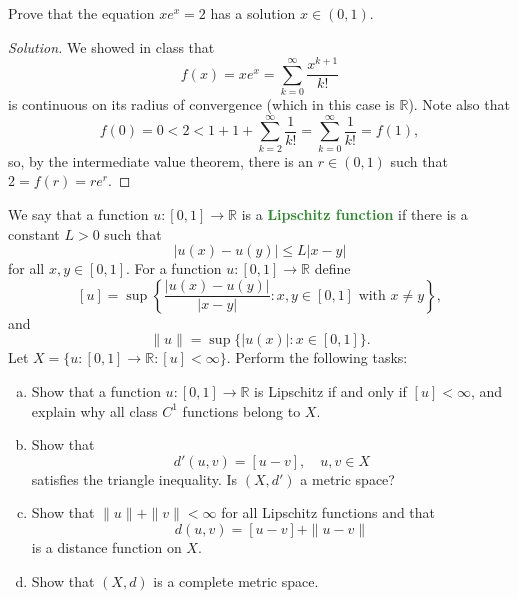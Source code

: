 \documentclass[11pt]{scrartcl}
\providecommand{\RR}{\mathbb R}
\providecommand{\ii}{\item}
\newenvironment{soln}{\begin{proof}[Solution]}{\end{proof}}
\providecommand{\vocab}[1]{{\textbf{\textcolor{ForestGreen}{#1}}}}
\begin{document}
\pagebreak
\begin{problem}
	Prove that the equation $xe^x = 2$ has a solution $x\in(0,1)$.
\end{problem}
\begin{soln}
	We showed in class that
	\[f(x) = xe^x = \sum_{k=0}^\infty \frac{x^{k+1}}{k!}\]
	is continuous on its radius of convergence (which in this case is $\RR$).
	Note also that
	\[f(0) = 0 < 2 < 1 + 1 + \sum_{k=2}^\infty \frac{1}{k!} =
	\sum_{k=0}^\infty \frac{1}{k!} = f(1),\]
	so, by the intermediate value theorem, there is an $r\in(0,1)$
	such that $2 = f(r) = re^r$.
\end{soln}

\pagebreak
\begin{problem}
	We say that a function $u\colon[0,1]\to\RR$ is a \vocab{Lipschitz function}
	if there is a constant $L > 0$ such that
	\[|u(x) - u(y)| \le L|x - y|\]
	for all $x,y\in[0,1]$. For a function $u\colon[0,1]\to\RR$ define
	\[[u] = \sup\left\{\frac{|u(x) - u(y)|}{|x - y|} :
	x, y\in[0,1]\text{ with }x\ne y\right\},\]
	and
	\[\|u\| = \sup\{|u(x)| : x\in[0,1]\}.\]
	Let $X = \{u\colon[0,1]\to\RR : [u] < \infty\}$.
	Perform the following tasks:
	\begin{enumerate}[(a)]
		\ii Show that a function $u\colon[0,1]\to\RR$ is Lipschitz
		if and only if $[u] < \infty$, and explain why
		all class $C^1$ functions belong to $X$.
		\ii Show that
		\[d'(u, v) = [u-v],\quad u,v\in X\]
		satisfies the triangle inequality.
		Is $(X, d')$ a metric space?
		\ii Show that $\|u\| + \|v\| < \infty$ for all Lipschitz functions
		and that
		\[d(u, v) = [u - v] + \|u - v\|\]
		is a distance function on $X$.
		\ii Show that $(X, d)$ is a complete metric space.
	\end{enumerate}
\end{problem}
\end{document}
